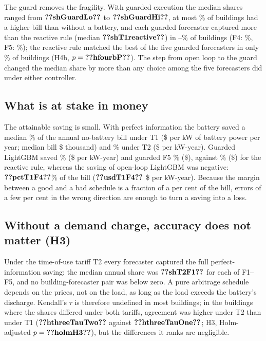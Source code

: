 The guard removes the fragility. With guarded execution the median shares ranged from $\res{shGuardLo}$ to $\res{shGuardHi}$, at most \% of buildings had a higher bill than without a battery, and each guarded forecaster captured more than the reactive rule (median $\res{shT1reactive}$) in --\% of buildings (F4: \%, F5: \%); the reactive rule matched the best of the five guarded forecasters in only \% of buildings (H4b, $p=\res{hfourbP}$). The step from open loop to the guard changed the median share by more than any choice among the five forecasters did under either controller.

\subsection{What is at stake in money}

The attainable saving is small. With perfect information the battery saved a median \% of the annual no-battery bill under T1 (\$ per kW of battery power per year; median bill \$ thousand) and \% under T2 (\$ per kW-year). Guarded LightGBM saved \% (\$ per kW-year) and guarded F5 \% (\$), against \% (\$) for the reactive rule, whereas the saving of open-loop LightGBM was negative: $\res{pctT1F4}$\% of the bill ($\res{usdT1F4}$ \$ per kW-year). Because the margin between a good and a bad schedule is a fraction of a per cent of the bill, errors of a few per cent in the wrong direction are enough to turn a saving into a loss.

\subsection{Without a demand charge, accuracy does not matter (H3)}

Under the time-of-use tariff T2 every forecaster captured the full perfect-information saving: the median annual share was $\res{shT2F1}$ for each of F1--F5, and no building-forecaster pair was below zero. A pure arbitrage schedule depends on the prices, not on the load, as long as the load exceeds the battery's discharge. Kendall's $\tau$ is therefore undefined in most buildings; in the  buildings where the shares differed under both tariffs, agreement was higher under T2 than under T1 ($\res{hthreeTauTwo}$ against $\res{hthreeTauOne}$; H3, Holm-adjusted $p=\res{holmH3}$), but the differences it ranks are negligible.

